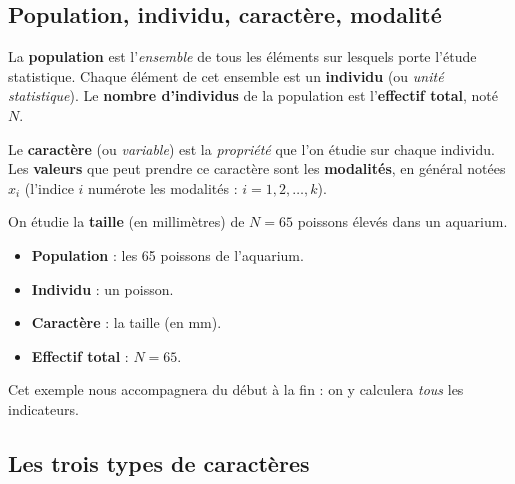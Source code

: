 \documentclass[11pt,a4paper]{article}
\begin{document}
\subsection{Population, individu, caractère, modalité}

\begin{definition}
La \textbf{population} est l'\emph{ensemble} de tous les éléments sur lesquels porte l'étude
statistique. Chaque élément de cet ensemble est un \textbf{individu} (ou \emph{unité statistique}).
Le \textbf{nombre d'individus} de la population est l'\textbf{effectif total}, noté $N$.
\end{definition}

\begin{definition}
Le \textbf{caractère} (ou \emph{variable}) est la \emph{propriété} que l'on étudie sur chaque
individu. Les \textbf{valeurs} que peut prendre ce caractère sont les \textbf{modalités}, en général
notées $x_i$ (l'indice $i$ numérote les modalités : $i=1,2,\ldots,k$).
\end{definition}

\begin{exemple}
On étudie la \textbf{taille} (en millimètres) de $N=65$ poissons élevés dans un aquarium.
\begin{itemize}[leftmargin=1.7em,topsep=2pt,itemsep=1pt]
  \item \textbf{Population} : les 65 poissons de l'aquarium.
  \item \textbf{Individu} : un poisson.
  \item \textbf{Caractère} : la taille (en mm).
  \item \textbf{Effectif total} : $N=65$.
\end{itemize}
Cet exemple nous accompagnera du début à la fin : on y calculera \emph{tous} les indicateurs.
\end{exemple}

\subsection{Les trois types de caractères}
\end{document}
